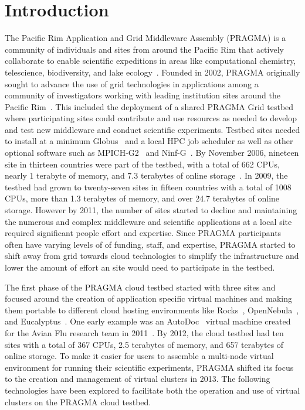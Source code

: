 \documentclass{acm_proc_article-sp}
\begin{document}


\section{Introduction}

The Pacific Rim Application and Grid Middleware Assembly (PRAGMA) is a community of individuals and sites from around the Pacific Rim that actively collaborate to enable scientific expeditions in areas like computational chemistry, telescience, biodiversity, and lake ecology~\cite{pragmaWeb}.  Founded in 2002, PRAGMA originally sought to advance the use of grid technologies in applications among a community of investigators working with leading institution sites around the Pacific Rim~\cite{pragmaReport2004}.  This included the deployment of a shared PRAGMA Grid testbed where participating sites could contribute and use resources as needed to develop and test new middleware and conduct scientific experiments.  Testbed sites needed to install at a minimum Globus~\cite{globus} and a local HPC job scheduler as well as other optional software such as MPICH-G2~\cite{mpichg2} and Ninf-G~\cite{ninfg}.  By November 2006, nineteen site in thirteen countries were part of the testbed, with a total of 662 CPUs, nearly 1 terabyte of memory, and 7.3 terabytes of online storage~\cite{pragmaReport2006}.  In 2009, the testbed had grown to twenty-seven sites in fifteen countries with a total of 1008 CPUs, more than 1.3 terabytes of memory, and over 24.7 terabytes of online storage.  However by 2011, the number of sites started to decline and maintaining the numerous and complex middleware and scientific applications at a local site required significant people effort and expertise.  Since PRAGMA participants often have varying levels of of funding, staff, and expertise, PRAGMA started to shift away from grid towards cloud technologies to simplify the infrastructure and lower the amount of effort an site would need to participate in the testbed.  

The first phase of the PRAGMA cloud testbed started with three sites and focused around the creation of application specific virtual machines and making them portable to  different cloud hosting environments like Rocks~\cite{rocks}, OpenNebula~\cite{opennebula}, and Eucalyptus~\cite{eucalyptus}.
One early example was an AutoDoc~\cite{autodock} virtual machine created for the Avian Flu research team in 2011~\cite{pragmaReport2011}.   By 2012, the cloud testbed had ten sites with a total of 367 CPUs, 2.5 terabytes of memory, and 657 terabytes of online storage.  To make it easier for users to assemble a multi-node virtual environment for running their scientific experiments, PRAGMA shifted its  focus to the creation and management of virtual clusters in 2013.  The following technologies have been explored to facilitate both the operation and use of virtual clusters on the PRAGMA cloud testbed.
\end{document}
